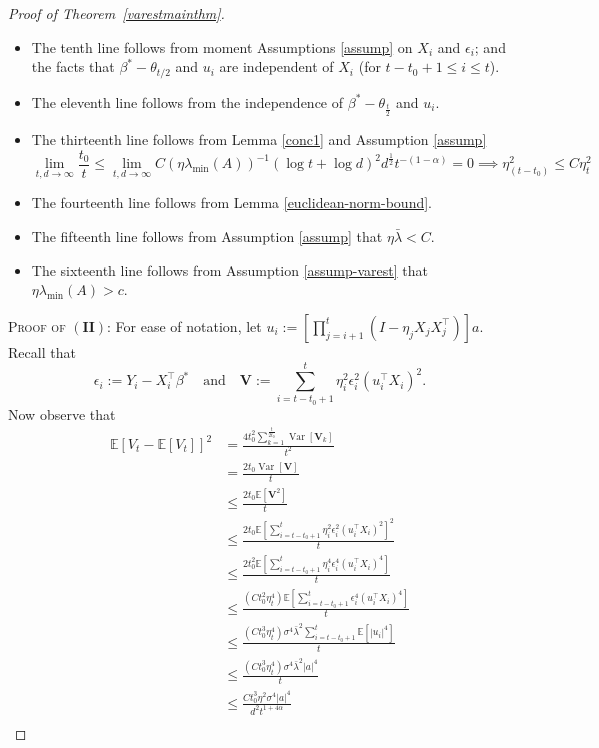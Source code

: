 \documentclass[11pt, reqno,english]{amsart}
\DeclareMathOperator{\Var}{Var} \DeclareMathOperator{\N}{N}
\begin{document}
\begin{proof}[Proof of Theorem~\ref{varestmainthm}]
\begin{itemize}
    \item The tenth line follows from moment  Assumptions \ref{assump} on $X_i$ and $\epsilon_i$; and the facts that $\beta^* - \theta_{t/2}$ and $u_i$ are independent of $X_i$ (for $t-t_0 + 1 \leq i \leq t$).
    \item The eleventh line follows from the independence of $\beta^* - \theta_{\frac{t}{2}}$ and $u_i$.
    \item The thirteenth line follows from Lemma \ref{conc1} and Assumption \ref{assump} $$\lim\limits_{t,d \to \infty} \frac{t_0}{t} \leq \lim\limits_{t,d \to \infty}C(\eta \lambda_{\min}(A))^{-1}(\log t + \log d)^2 d^{\frac{1}{2}}t^{-(1 - \alpha)} = 0 \implies \eta^2_{(t-t_0)} \leq C \eta^2_t$$
    \item The fourteenth line follows from Lemma \ref{euclidean-norm-bound}.
    \item The fifteenth line follows from Assumption \ref{assump} that $\eta \bar{\lambda} < C$.
    \item The sixteenth line follows from Assumption \ref{assump-varest} that $\eta \lambda_{\min}(A) > c$. 
\end{itemize}
\textsc{Proof of $(\mathbf{II})$:} 
For ease of notation, let $u_i := [\prod_{j = i+1}^{t}(I - \eta_{j}X_{j}X^\top_{j})]a$.
Recall that $$\epsilon_i := Y_i - X^\top_i \beta^* \quad \text{and} \quad \mathbf{V} := \sum_{i = t-t_0+1}^t \eta^2_i \epsilon^2_i (u^\top_iX_i)^2.$$ Now observe that
\begin{align*}
\mathbb{E}[V_t - \mathbb{E}[V_t]]^2 &= \frac{4t^2_0\sum_{k = 1}^{\frac{t}{2t_0}}\Var [\mathbf{V}_k]}{t^2} 
\\
&= \frac{2t_0\Var[\mathbf{V}]}{t}
\\
&\leq \frac{2t_0\mathbb{E}[\mathbf{V}^2]}{t}
\\
&\leq \frac{2t_0 \mathbb{E}[\sum_{i = t-t_0 + 1}^t \eta^2_i\epsilon^2_i(u^\top_iX_i)^2]^2}{t}
\\
&\leq \frac{2t_0^2\mathbb{E}[\sum_{i = t-t_0 + 1}^t\eta^4_i\epsilon^4_i(u^\top_iX_i)^4]}{t}
\\
&\leq \frac{(Ct_0^2\eta^4_t)\mathbb{E}[\sum_{i = t-t_0 + 1}^t\epsilon^4_i(u^\top_iX_i)^4]}{t}
\\
&\leq \frac{(Ct^3_0\eta^4_t)\sigma^4\bar{\lambda}^2\sum_{i = t-t_0 + 1}^t \mathbb{E}[|u_i|^4]}{t}
\\
&\leq \frac{(Ct^3_0\eta^4_t)\sigma^4\bar{\lambda}^2|a|^4}{t}
\\
&\leq \frac{Ct^3_0\eta^2\sigma^4|a|^4}{d^2t^{1 + 4\alpha}}
\\

\end{align*}
\end{proof}
\end{document}
